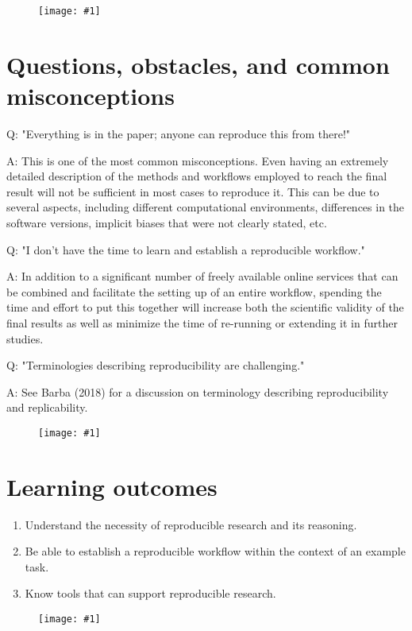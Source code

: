 \documentclass{article}
\newlength{\imgwidth}
\newcommand\scaledgraphics[2]{%
                
\settowidth{\imgwidth}{\texttt{[image: \#1]}}%
                
\setlength{\imgwidth}{\minof{\imgwidth}{#2\textwidth}}%
                
\texttt{[image: \#1]}%
                
}
\begin{document}
\begin{figure}
\scaledgraphics{2b202773-ec41-4cde-8558-44800112ec6d.png}{1}
\label{F37038591}
\end{figure}


\section{Questions, obstacles, and common misconceptions}\label{questions-obstacles-and-common-misconceptions}



Q: "Everything is in the paper; anyone can reproduce this from there!"


A: This is one of the most common misconceptions. Even having an extremely detailed description of the methods and workflows employed to reach the final result will not be sufficient in most cases to reproduce it. This can be due to several aspects, including different computational environments, differences in the software versions, implicit biases that were not clearly stated, etc.


Q: "I don’t have the time to learn and establish a reproducible workflow."


A: In addition to a significant number of freely available online services that can be combined and facilitate the setting up of an entire workflow, spending the time and effort to put this together will increase both the scientific validity of the final results as well as minimize the time of re-running or extending it in further studies.


Q: "Terminologies describing reproducibility are challenging."


A: See Barba (2018) for a discussion on terminology describing reproducibility and replicability.

\begin{figure}
\scaledgraphics{78242a58-956c-4a6f-8d50-a93e47eb21b4.png}{1}
\label{F67366301}
\end{figure}


\section{Learning outcomes}\label{learning-outcomes}


\begin{enumerate}
\item Understand the necessity of reproducible research and its reasoning.


\item Be able to establish a reproducible workflow within the context of an example task.


\item Know tools that can support reproducible research.


\end{enumerate}
\begin{figure}
\scaledgraphics{28184297-5028-4ac9-bc5f-7a459edf50cf.png}{1}
\label{F56536271}
\end{figure}
\end{document}
